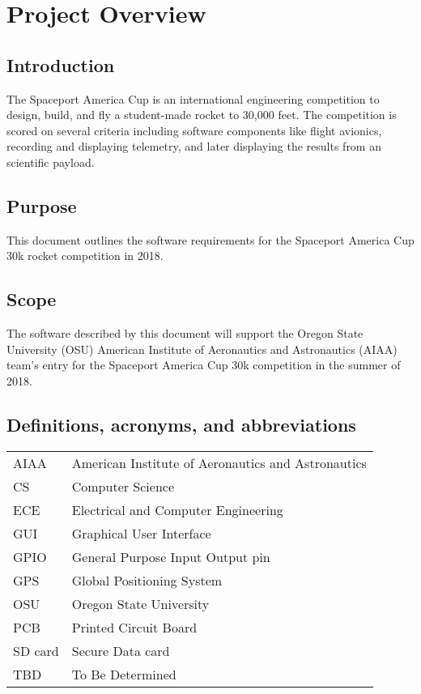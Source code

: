 \documentclass[onecolumn, draftclsnofoot, 10pt, compsoc]{IEEEtran}
\begin{document}
\section{Project Overview}
\subsection{Introduction}
The Spaceport America Cup is an international engineering competition to design, build, and fly a student-made rocket to 30,000 feet.  The competition is scored on several criteria including software components like flight avionics, recording and displaying telemetry, and later displaying the results from an scientific payload.

\subsection{Purpose}
This document outlines the software requirements for the Spaceport America Cup 30k rocket competition in 2018.

\subsection{Scope}
The software described by this document will support the Oregon State University (OSU) American Institute of Aeronautics and Astronautics (AIAA) team's entry for the Spaceport America Cup 30k competition in the summer of 2018.

\subsection{Definitions, acronyms, and abbreviations}
\begin{center}
  \begin{tabular}{|l|l|}
      \hline
      AIAA	&American Institute of Aeronautics and Astronautics\\
      CS		&Computer Science\\
      \hline
      ECE		&Electrical and Computer Engineering\\
      GUI		&Graphical User Interface\\
      \hline
      GPIO	&General Purpose Input Output pin\\
      GPS		&Global Positioning System\\
      \hline
      OSU		&Oregon State University\\
      PCB		&Printed Circuit Board\\
      \hline
      SD card	&Secure Data card\\
      TBD		&To Be Determined\\
      \hline
  \end{tabular}
\end{center}
\end{document}
